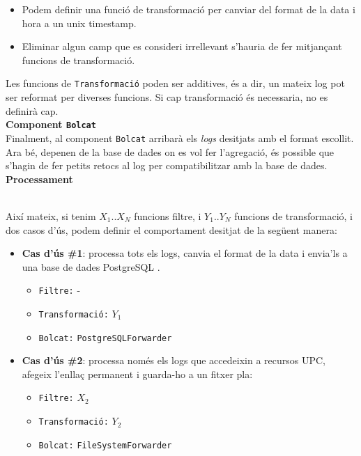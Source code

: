 \begin{itemize}
    \item Podem definir una funció de transformació per canviar del format de la data i hora a un unix timestamp.
    \item Eliminar algun camp que es consideri irrellevant s’hauria de fer mitjançant funcions de transformació.
\end{itemize}

\noindent
Les funcions de \texttt{Transformació} poden ser additives, és a dir, un mateix log pot ser reformat per diverses funcions.
Si cap transformació és necessaria, no es definirà cap. \\

\noindent
\textbf{Component \texttt{Bolcat}} \\

\noindent
Finalment, al component \texttt{Bolcat} arribarà els \textit{logs} desitjats amb el format escollit.
Ara bé, depenen de la base de dades on es vol fer l’agregació, és possible que s’hagin de fer petits retocs al log per compatibilitzar amb la base de dades. \\

\noindent
\textbf{Processament}

\noindent \\
Així mateix, si tenim \(X_1\)..\(X_N\) funcions filtre, i \(Y_1\)..\(Y_N\) funcions de transformació, i dos casos d’ús, podem definir el comportament desitjat de la següent manera:

\begin{itemize}
    \item \textbf{Cas d'ús \#1}: processa tots els logs, canvia el format de la data i envia'ls a una base de dades PostgreSQL .
    \begin{itemize}
        \item \texttt{Filtre:} -
        \item \texttt{Transformació:} \(Y_1\)
        \item \texttt{Bolcat:} \texttt{PostgreSQLForwarder}
    \end{itemize}
    \item \textbf{Cas d'ús \#2}: processa només els logs que accedeixin a recursos UPC, afegeix l’enllaç permanent i guarda-ho a un fitxer pla:
    \begin{itemize}
        \item \texttt{Filtre:} \(X_2\)
        \item \texttt{Transformació:} \(Y_2\)
        \item \texttt{Bolcat:} \texttt{FileSystemForwarder}
    \end{itemize}
\end{itemize}

